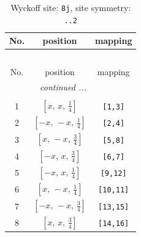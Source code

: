 \documentclass[fleqn,8pt]{jsarticle}
\begin{document}
\begin{longtable}{ccc}
\caption{Wyckoff site: {\tt 8j}, site symmetry: {\tt ..2}}
 \\
 \hline \hline
No. & position & mapping \\ \hline \endfirsthead

\multicolumn{2}{l}{\tablename\ \thetable{}} \\
 \hline \hline
No. & position & mapping \\ \hline \endhead

 \hline \hline
\multicolumn{2}{r}{\footnotesize\it continued ...} \\ \endfoot

 \hline \hline
\multicolumn{2}{r}{} \\ \endlastfoot

1 & $\left[ x,\, x,\, \frac{1}{4} \right]$ & {\tt [1,3]} \\ \hline
2 & $\left[ - x,\, - x,\, \frac{1}{4} \right]$ & {\tt [2,4]} \\ \hline
3 & $\left[ x,\, - x,\, \frac{3}{4} \right]$ & {\tt [5,8]} \\ \hline
4 & $\left[ - x,\, x,\, \frac{3}{4} \right]$ & {\tt [6,7]} \\ \hline
5 & $\left[ - x,\, x,\, \frac{1}{4} \right]$ & {\tt [9,12]} \\ \hline
6 & $\left[ x,\, - x,\, \frac{1}{4} \right]$ & {\tt [10,11]} \\ \hline
7 & $\left[ - x,\, - x,\, \frac{3}{4} \right]$ & {\tt [13,15]} \\ \hline
8 & $\left[ x,\, x,\, \frac{3}{4} \right]$ & {\tt [14,16]} \\
\end{longtable}
\renewcommand{\arraystretch}{1.2}
\end{document}
